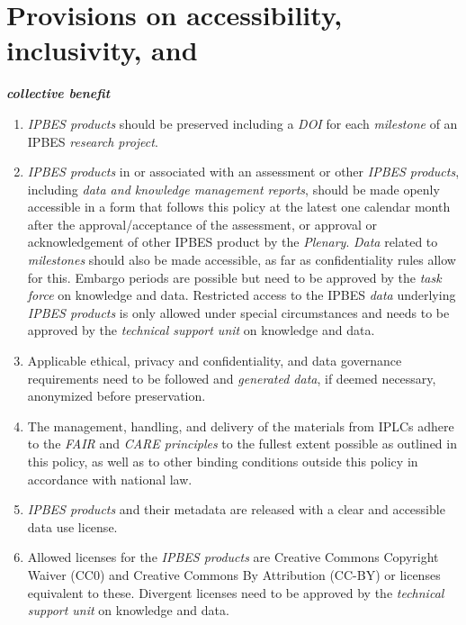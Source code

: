 \documentclass{article}
\begin{document}
\section*{Provisions on accessibility, inclusivity, and }\textit{\textbf{collective benefit}}

\begin{enumerate}[label=(\alph*)] %
    \item \textit{IPBES products} should be preserved including a \textit{DOI} for each \textit{milestone} of an IPBES \textit{research project}.
    
    \item \textit{IPBES products} in or associated with an assessment or other \textit{IPBES products}, including \textit{data and knowledge management reports}, should be made openly accessible in a form that follows this policy at the latest one calendar month after the approval/acceptance of the assessment, or approval or acknowledgement of other IPBES product by the \textit{Plenary}. \textit{Data} related to \textit{milestones} should also be made accessible, as far as confidentiality rules allow for this. Embargo periods are possible but need to be approved by the \textit{task force} on knowledge and data. Restricted access to the IPBES \textit{data} underlying \textit{IPBES products} is only allowed under special circumstances and needs to be approved by the \textit{technical support unit} on knowledge and data.
    
    \item Applicable ethical, privacy and confidentiality, and data governance requirements need to be followed and \textit{generated data}, if deemed necessary, anonymized before preservation.
    
    \item The management, handling, and delivery of the materials from IPLCs adhere to the \textit{FAIR} and \textit{CARE principles} to the fullest extent possible as outlined in this policy, as well as to other binding conditions outside this policy in accordance with national law.
    
    \item \textit{IPBES products} and their metadata are released with a clear and accessible data use license.
    
    \item Allowed licenses for the \textit{IPBES products} are Creative Commons Copyright Waiver (CC0) and Creative Commons By Attribution (CC-BY) or licenses equivalent to these. Divergent licenses need to be approved by the \textit{technical support unit} on knowledge and data.
    

\end{enumerate}
\end{document}
